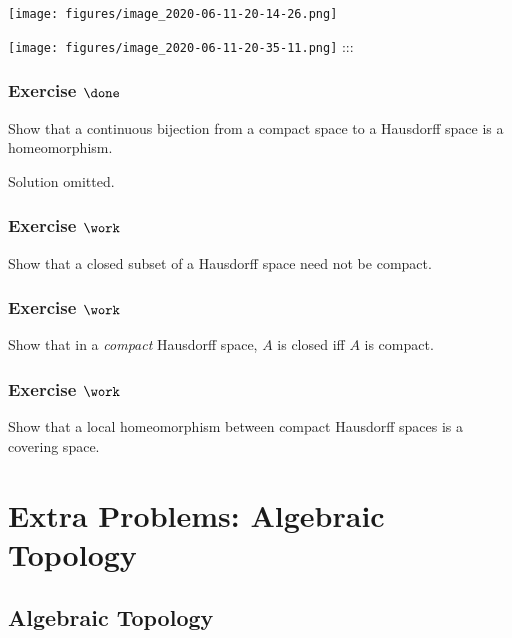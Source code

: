\texttt{[image: figures/image\_2020-06-11-20-14-26.png]}

\texttt{[image: figures/image\_2020-06-11-20-35-11.png]} :::

\hypertarget{exercise-done-3}{%
\subsubsection{\texorpdfstring{Exercise
\(\done\)}{Exercise \textbackslash done}}\label{exercise-done-3}}

Show that a continuous bijection from a compact space to a Hausdorff
space is a homeomorphism.

Solution omitted.

\hypertarget{exercise-work-39}{%
\subsubsection{\texorpdfstring{Exercise
\(\work\)}{Exercise \textbackslash work}}\label{exercise-work-39}}

Show that a closed subset of a Hausdorff space need not be compact.

\hypertarget{exercise-work-40}{%
\subsubsection{\texorpdfstring{Exercise
\(\work\)}{Exercise \textbackslash work}}\label{exercise-work-40}}

Show that in a \emph{compact} Hausdorff space, \(A\) is closed iff \(A\)
is compact.

\hypertarget{exercise-work-41}{%
\subsubsection{\texorpdfstring{Exercise
\(\work\)}{Exercise \textbackslash work}}\label{exercise-work-41}}

Show that a local homeomorphism between compact Hausdorff spaces is a
covering space.

\hypertarget{extra-problems-algebraic-topology}{%
\section{Extra Problems: Algebraic
Topology}\label{extra-problems-algebraic-topology}}

\hypertarget{algebraic-topology}{%
\subsection{Algebraic Topology}\label{algebraic-topology}}

